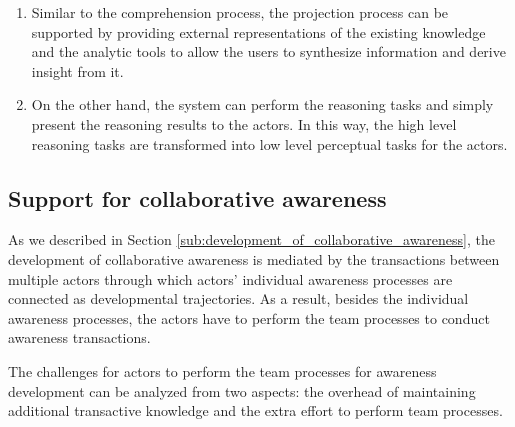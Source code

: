 \begin{enumerate}
   \item Similar to the comprehension process, the projection process can be supported by providing external representations of the existing knowledge and the analytic tools to allow the users to synthesize information and derive insight from it.
   \item On the other hand, the system can perform the reasoning tasks and simply present the reasoning results to the actors. In this way, the high level reasoning tasks are transformed into low level perceptual tasks for the actors.
\end{enumerate}
\subsection{Support for collaborative awareness} %
\label{sub:support_for_collaborative_awareness}
As we described in Section \ref{sub:development_of_collaborative_awareness}, the development of collaborative awareness is mediated by the transactions between multiple actors through which actors' individual awareness processes are connected as developmental trajectories. As a result, besides the individual awareness processes, the actors have to perform the team processes to conduct awareness transactions.

The challenges for actors to perform the team processes for awareness development can be analyzed from two aspects: the overhead of maintaining additional transactive knowledge and the extra effort to perform team processes. 

